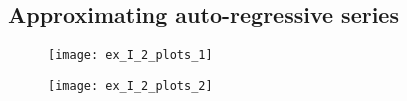 
\subsection{Approximating auto-regressive series}


\begin{figure}[H]
	\centering
	\texttt{[image: ex\_I\_2\_plots\_1]}
	\label{fig:ex_I_2_plots_1}
	\caption{}
\end{figure}

\begin{figure}[H]
	\centering
	\texttt{[image: ex\_I\_2\_plots\_2]}
	\label{fig:ex_I_2_plots_2}
	\caption{}
\end{figure}



